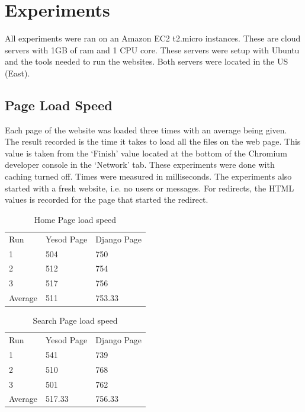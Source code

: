 \chapter{Experiments}
\label{app:Experiments}

All experiments were ran on an Amazon EC2 t2.micro instances. These
are cloud servers with 1GB of ram and 1 CPU core. These servers
were setup with Ubuntu and the tools needed to run the websites.
Both servers were located in the US (East).

\section{Page Load Speed}
\label{sec:pageLoadSpeeds}

Each page of the website was loaded three times with an average being
given. The result recorded is the time it takes to load all the files
on the web page. This
value is taken from the `Finish' value located at the bottom of
the Chromium developer console in the `Network' tab. These
experiments were done with caching turned off. Times were measured
in milliseconds. The experiments also started with a fresh website,
i.e. no users or messages. For redirects, the HTML values is recorded
for the page that started the redirect.

\begin{table}[H]
	\caption{Home Page load speed}
	\begin{center}
		\begin{tabular}{ | l | l | l |}
			\hline
			Run & Yesod Page & Django Page \\
			1 & 504 & 750 \\
			2 & 512 & 754 \\
			3 & 517 & 756 \\
			Average & 511 & 753.33 \\
			\hline
		\end{tabular}
	\end{center}
	\label{tab:pageLoadSpeeds}
\end{table}

\begin{table}[H]
	\caption{Search Page load speed}
	\begin{center}
		\begin{tabular}{ | l | l | l |}
			\hline
			Run & Yesod Page & Django Page \\
			1 & 541 & 739 \\
			2 & 510 & 768 \\
			3 & 501 & 762 \\
			Average & 517.33 & 756.33 \\
			\hline
		\end{tabular}
	\end{center}
	\label{tab:searchLoadSpeeds}
\end{table}

